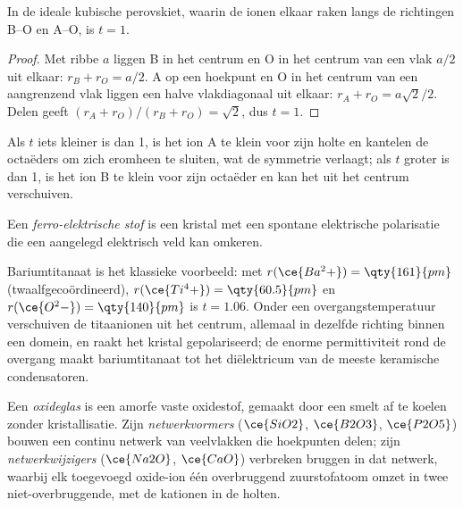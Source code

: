 \begin{proposition}\label{prop:b3:inorganic-materials:tolerance}
In de ideale kubische perovskiet, waarin de ionen elkaar raken langs de
richtingen B--O en A--O, is $t = 1$.
\end{proposition}

\begin{proof}
Met ribbe $a$ liggen B in het centrum en O in het centrum van een vlak $a/2$ uit elkaar: $r_B + r_O = a/2$.
A op een hoekpunt en O in het centrum van een aangrenzend vlak liggen een
halve vlakdiagonaal uit elkaar: $r_A + r_O = a\sqrt2/2$. Delen geeft $(r_A + r_O)/(r_B + r_O) = \sqrt2$, dus $t = 1$.
\end{proof}

Als $t$ iets kleiner is dan 1, is het ion A te klein voor zijn holte en
kantelen de octaëders om zich eromheen te sluiten, wat de symmetrie
verlaagt; als $t$ groter is dan 1,
is het ion B te klein voor zijn octaëder en kan het uit het centrum
verschuiven.

\begin{definition}\label{def:b3:inorganic-materials:ferroelectric}
Een \emph{ferro-elektrische stof} is een
kristal met een spontane elektrische polarisatie die een aangelegd
elektrisch veld kan omkeren.
\end{definition}

Bariumtitanaat is het klassieke voorbeeld: met $r(\ce{Ba^2+}) = \qty{161}{pm}$ (twaalfgecoördineerd),
$r(\ce{Ti^4+}) = \qty{60.5}{pm}$ en $r(\ce{O^2-}) = \qty{140}{pm}$ is $t = 1.06$. Onder een overgangstemperatuur
verschuiven de titaanionen uit het centrum, allemaal in dezelfde richting
binnen een domein, en raakt het kristal gepolariseerd; de enorme
permittiviteit rond de overgang maakt bariumtitanaat tot het diëlektricum
van de meeste keramische condensatoren.

\begin{definition}[Oxideglazen]\label{def:b3:inorganic-materials:glass}
Een \emph{oxideglas} is een amorfe vaste oxidestof,
gemaakt door een smelt af te koelen zonder kristallisatie. Zijn
\emph{netwerkvormers} ($\ce{SiO2}$, $\ce{B2O3}$, $\ce{P2O5}$) bouwen een continu netwerk van
veelvlakken die hoekpunten delen; zijn
\emph{netwerkwijzigers}
($\ce{Na2O}$, $\ce{CaO}$) verbreken bruggen in dat netwerk, waarbij elk toegevoegd oxide-ion
één overbruggend zuurstofatoom omzet in twee niet-overbruggende, met de
kationen in de holten.
\end{definition}

